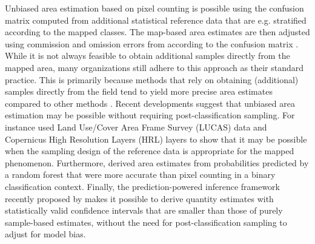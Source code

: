     Unbiased area estimation based on pixel counting is possible using the confusion matrix computed from additional statistical reference data that are e.g. stratified according to the mapped classes. The map-based area estimates are then adjusted using commission and omission errors from according to the confusion matrix \citep{stehman2013estimating,stehman2014estimating,olofsson2013making,olofsson2014good}. 
    While it is not always feasible to obtain additional samples directly from the mapped area, many organizations still adhere to this approach as their standard practice. This is primarily because methods that rely on obtaining (additional) samples directly from the field tend to yield more precise area estimates compared to other methods \citep{finegold2016map,gallego2017copernicus,redd2022estimating,angelopoulos2023predictionpowered}.
    Recent developments suggest that unbiased area estimation may be possible without requiring post-classification sampling. For instance \citep{kleinewillinghofer2022unbiased} used Land Use/Cover Area Frame Survey (LUCAS) data and Copernicus High Resolution Layers (HRL) layers to show that it may be possible when the sampling design of the reference data is appropriate for the mapped phenomenon. Furthermore, \citet{sales2022land} derived area estimates from probabilities predicted by a random forest that were  more accurate than pixel counting in a binary classification context. Finally, the prediction-powered inference framework recently proposed by \citet{angelopoulos2023predictionpowered} makes it possible to derive quantity estimates with statistically valid confidence intervals that are smaller than those of purely sample-based estimates, without the need for post-classification sampling to adjust for model bias.
    
